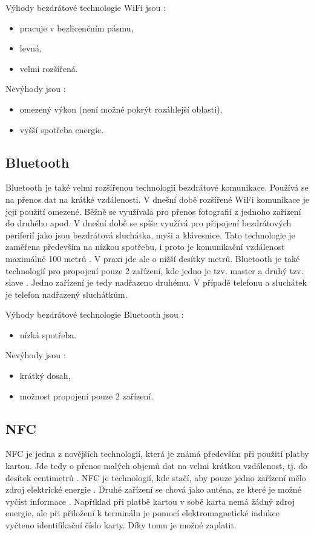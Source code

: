 Výhody bezdrátové technologie WiFi jsou \cite{Bezdrat_muni}:
\begin{itemize}
  \item pracuje v bezlicenčním pásmu, %
  \item levná, %
  \item velmi rozšířená.
\end{itemize}

Nevýhody jsou \cite{Bezdrat_muni}:
\begin{itemize}
  \item omezený výkon (není možné pokrýt rozáhlejší oblasti), %
  \item vyšší spotřeba energie.
\end{itemize}

\subsection{Bluetooth}
Bluetooth je také velmi rozšířenou technologií bezdrátové komunikace. Používá se na přenos dat na krátké vzdálenosti. V dnešní době 
rozšířené WiFi komunikace je její použití omezené. Běžně se využívala pro přenos fotografií z jednoho zařízení do druhého apod. V dnešní 
době se spíše využívá pro připojení bezdrátových periferií jako jsou bezdrátová sluchátka, myši a klávesnice. Tato technologie je zaměřena 
především na nízkou spotřebu, i proto je komunikační vzdálenost maximálně 100 metrů \cite{Bezdrat_muni}. V praxi jde ale o nižší desítky
metrů. Bluetooth je také technologií pro propojení pouze 2 zařízení, kde jedno je tzv. master a druhý tzv. slave \cite{Bezdrat_muni}. 
Jedno zařízení je tedy nadřazeno druhému. V případě telefonu a sluchátek je telefon nadřazený sluchátkům. 

Výhody bezdrátové technologie Bluetooth jsou \cite{Bezdrat_muni}:
\begin{itemize}
  \item nízká spotřeba.
\end{itemize}

Nevýhody jsou \cite{Bezdrat_muni}:
\begin{itemize}
  \item krátký dosah,
  \item možnost propojení pouze 2 zařízení.
\end{itemize}

\subsection{NFC}
NFC je jedna z novějších technologií, která je známá především při použití platby kartou. Jde tedy o přenos malých objemů dat na velmi krátkou 
vzdálenost, tj. do desítek centimetrů \cite{Bezdrat_muni}. NFC je technologií, kde stačí, aby pouze jedno zařízení mělo zdroj elektrické 
energie \cite{Bezdrat_muni}. Druhé zařízení se chová jako anténa, ze které je možné vyčíst informace \cite{Bezdrat_muni}. Například při 
platbě kartou v sobě karta nemá žádný zdroj energie, ale při přiložení k terminálu je pomocí elektromagnetické indukce vyčteno identifikační
číslo karty. Díky tomu je možné zaplatit. 

